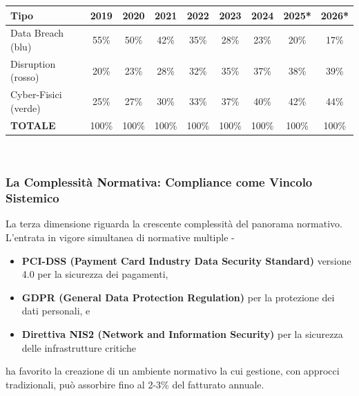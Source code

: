 %
\begin{tabular}{|l|c|c|c|c|c|c|c|c|}
\hline
\textbf{Tipo} & \textbf{2019} & \textbf{2020} & \textbf{2021} & \textbf{2022} & \textbf{2023} & \textbf{2024} & \textbf{2025*} & \textbf{2026*} \\
\hline
Data Breach (blu) & 55\% & 50\% & 42\% & 35\% & 28\% & 23\% & 20\% & 17\% \\
\hline
Disruption (rosso) & 20\% & 23\% & 28\% & 32\% & 35\% & 37\% & 38\% & 39\% \\
\hline
Cyber-Fisici (verde) & 25\% & 27\% & 30\% & 33\% & 37\% & 40\% & 42\% & 44\% \\
\hline
\textbf{TOTALE} & 100\% & 100\% & 100\% & 100\% & 100\% & 100\% & 100\% & 100\% \\
\hline
\end{tabular}\\

\subsubsection{La Complessità Normativa: Compliance come Vincolo Sistemico}

La terza dimensione riguarda la crescente complessità del panorama normativo. L'entrata in vigore simultanea di normative multiple - 
\begin{itemize}
    \item \textbf{PCI-DSS (Payment Card Industry Data Security Standard)} versione 4.0 per la sicurezza dei pagamenti,
    \item \textbf{GDPR (General Data Protection Regulation)} per la protezione dei dati personali, e
    \item \textbf{Direttiva NIS2 (Network and Information Security) }per la sicurezza delle infrastrutture critiche 
\end{itemize}
ha favorito la creazione di  un ambiente normativo la cui gestione, con approcci tradizionali, può assorbire fino al 2-3\% del fatturato annuale\autocite{ponemon2024compliance}.


